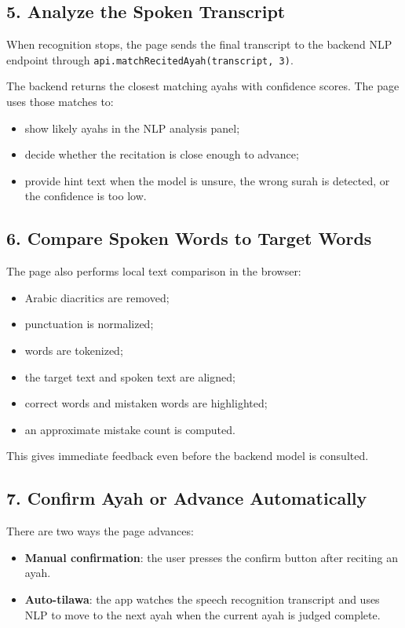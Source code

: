 \documentclass[11pt,a4paper]{article}
\begin{document}
\subsection{5. Analyze the Spoken Transcript}
When recognition stops, the page sends the final transcript to the backend NLP endpoint through \texttt{api.matchRecitedAyah(transcript, 3)}.

The backend returns the closest matching ayahs with confidence scores. The page uses those matches to:
\begin{itemize}
  \item show likely ayahs in the NLP analysis panel;
  \item decide whether the recitation is close enough to advance;
  \item provide hint text when the model is unsure, the wrong surah is detected, or the confidence is too low.
\end{itemize}

\subsection{6. Compare Spoken Words to Target Words}
The page also performs local text comparison in the browser:
\begin{itemize}
  \item Arabic diacritics are removed;
  \item punctuation is normalized;
  \item words are tokenized;
  \item the target text and spoken text are aligned;
  \item correct words and mistaken words are highlighted;
  \item an approximate mistake count is computed.
\end{itemize}

This gives immediate feedback even before the backend model is consulted.

\subsection{7. Confirm Ayah or Advance Automatically}
There are two ways the page advances:
\begin{itemize}
  \item \textbf{Manual confirmation}: the user presses the confirm button after reciting an ayah.
  \item \textbf{Auto-tilawa}: the app watches the speech recognition transcript and uses NLP to move to the next ayah when the current ayah is judged complete.
\end{itemize}
\end{document}
